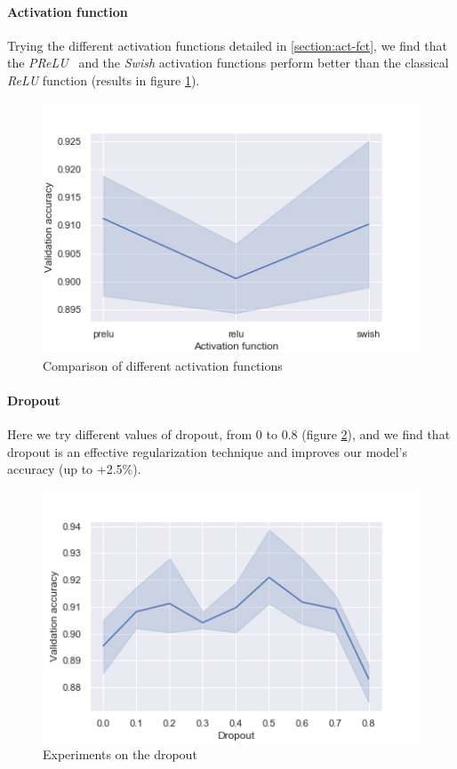 \documentclass{article}
\begin{document}
\paragraph{Activation function}
Trying the different activation functions detailed in \ref{section:act-fct}, we find that the \emph{PReLU} \cite{He_2015-prelu} and the \emph{Swish} \cite{ramach2017-swish} activation functions perform better than the classical \emph{ReLU} function (results in figure \ref{fig:act-fct}).
\begin{figure}
    \centering
    \includegraphics[width=0.6\linewidth]{img/act_fct.png}
    \caption{Comparison of different activation functions}
    \label{fig:act-fct}
\end{figure}

\paragraph{Dropout}
Here we try different values of dropout, from 0 to 0.8 (figure \ref{fig:dropout}), and we find that dropout is an effective regularization technique and improves our model's accuracy (up to +2.5\%).
\begin{figure}
    \centering
    \includegraphics[width=0.6\linewidth]{img/dropout.png}
    \caption{Experiments on the dropout}
    \label{fig:dropout}
\end{figure}
\end{document}
